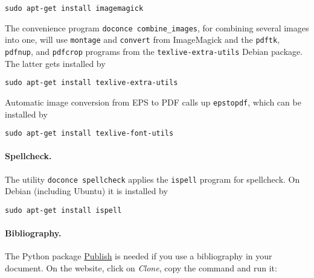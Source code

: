\documentclass[%
oneside,                 %
final,                   %
10pt]{article}
\begin{document}
\vspace{4pt}
\begin{Verbatim}[numbers=none,frame=lines,fontsize=\fontsize{9pt}{9pt},labelposition=topline,framesep=2.5mm,framerule=0.7pt]
sudo apt-get install imagemagick
\end{Verbatim}

The convenience program {\fontsize{10pt}{10pt}\Verb!doconce combine_images!}, for combining several
images into one, will use {\fontsize{10pt}{10pt}\Verb!montage!} and {\fontsize{10pt}{10pt}\Verb!convert!} from ImageMagick and
the {\fontsize{10pt}{10pt}\Verb!pdftk!}, {\fontsize{10pt}{10pt}\Verb!pdfnup!}, and {\fontsize{10pt}{10pt}\Verb!pdfcrop!} programs from the {\fontsize{10pt}{10pt}\Verb!texlive-extra-utils!}
Debian package. The latter gets installed by

\vspace{4pt}
\begin{Verbatim}[numbers=none,frame=lines,fontsize=\fontsize{9pt}{9pt},labelposition=topline,framesep=2.5mm,framerule=0.7pt]
sudo apt-get install texlive-extra-utils
\end{Verbatim}

Automatic image conversion from EPS to PDF calls up {\fontsize{10pt}{10pt}\Verb!epstopdf!}, which
can be installed by

\vspace{4pt}
\begin{Verbatim}[numbers=none,frame=lines,fontsize=\fontsize{9pt}{9pt},labelposition=topline,framesep=2.5mm,framerule=0.7pt]
sudo apt-get install texlive-font-utils
\end{Verbatim}

\paragraph{Spellcheck.}
The utility {\fontsize{10pt}{10pt}\Verb!doconce spellcheck!} applies the {\fontsize{10pt}{10pt}\Verb!ispell!} program for
spellcheck. On Debian (including Ubuntu) it is installed by

\vspace{4pt}
\begin{Verbatim}[numbers=none,frame=lines,fontsize=\fontsize{9pt}{9pt},labelposition=topline,framesep=2.5mm,framerule=0.7pt]
sudo apt-get install ispell
\end{Verbatim}


\paragraph{Bibliography.}
The Python package \href{{https://bitbucket.org/logg/publish}}{Publish} is needed if you use a bibliography
in your document. On the website, click on \emph{Clone}, copy the
command and run it:
\end{document}
